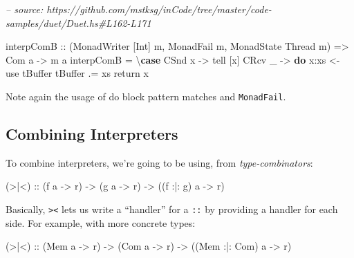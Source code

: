 \documentclass[]{article}
\newenvironment{Shaded}{}{}
\newcommand{\CommentTok}[1]{\textcolor[rgb]{0.38,0.63,0.69}{\textit{#1}}}
\newcommand{\DataTypeTok}[1]{\textcolor[rgb]{0.56,0.13,0.00}{#1}}
\newcommand{\FunctionTok}[1]{\textcolor[rgb]{0.02,0.16,0.49}{#1}}
\newcommand{\KeywordTok}[1]{\textcolor[rgb]{0.00,0.44,0.13}{\textbf{#1}}}
\newcommand{\NormalTok}[1]{#1}
\newcommand{\OtherTok}[1]{\textcolor[rgb]{0.00,0.44,0.13}{#1}}
\begin{document}
\begin{Shaded}
\begin{Highlighting}[]
\CommentTok{-- source: https://github.com/mstksg/inCode/tree/master/code-samples/duet/Duet.hs#L162-L171}

\NormalTok{interpComB}
\OtherTok{    ::}\NormalTok{ (}\DataTypeTok{MonadWriter}\NormalTok{ [}\DataTypeTok{Int}\NormalTok{] m, }\DataTypeTok{MonadFail}\NormalTok{ m, }\DataTypeTok{MonadState} \DataTypeTok{Thread}\NormalTok{ m)}
    \OtherTok{=>} \DataTypeTok{Com}\NormalTok{ a}
    \OtherTok{->}\NormalTok{ m a}
\NormalTok{interpComB }\FunctionTok{=}\NormalTok{ \textbackslash{}}\KeywordTok{case}
    \DataTypeTok{CSnd}\NormalTok{ x }\OtherTok{->}\NormalTok{ tell [x]}
    \DataTypeTok{CRcv}\NormalTok{ _ }\OtherTok{->} \KeywordTok{do}
\NormalTok{      x}\FunctionTok{:}\NormalTok{xs }\OtherTok{<-}\NormalTok{ use tBuffer}
\NormalTok{      tBuffer }\FunctionTok{.=}\NormalTok{ xs}
\NormalTok{      return x}
\end{Highlighting}
\end{Shaded}

Note again the usage of do block pattern matches and \texttt{MonadFail}.

\hypertarget{combining-interpreters}{%
\subsection{Combining Interpreters}\label{combining-interpreters}}

To combine interpreters, we're going to be using, from \emph{type-combinators}:

\begin{Shaded}
\begin{Highlighting}[]
\OtherTok{(>|<) ::}\NormalTok{ (f a }\OtherTok{->}\NormalTok{ r)}
      \OtherTok{->}\NormalTok{ (g a }\OtherTok{->}\NormalTok{ r)}
      \OtherTok{->}\NormalTok{ ((f }\FunctionTok{:|:}\NormalTok{ g) a }\OtherTok{->}\NormalTok{ r)}
\end{Highlighting}
\end{Shaded}

Basically, \texttt{\textgreater{}\textbar{}\textless{}} lets us write a
``handler'' for a \texttt{:\textbar{}:} by providing a handler for each side.
For example, with more concrete types:

\begin{Shaded}
\begin{Highlighting}[]
\OtherTok{(>|<) ::}\NormalTok{ (}\DataTypeTok{Mem}\NormalTok{ a }\OtherTok{->}\NormalTok{ r)}
      \OtherTok{->}\NormalTok{ (}\DataTypeTok{Com}\NormalTok{ a }\OtherTok{->}\NormalTok{ r)}
      \OtherTok{->}\NormalTok{ ((}\DataTypeTok{Mem} \FunctionTok{:|:} \DataTypeTok{Com}\NormalTok{) a }\OtherTok{->}\NormalTok{ r)}
\end{Highlighting}
\end{Shaded}
\end{document}
